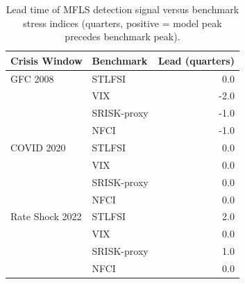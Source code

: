 \begin{table}[h]
\centering
\caption{Lead time of MFLS detection signal versus benchmark stress indices (quarters, positive = model peak precedes benchmark peak).}
\label{tab:lead_times}
\begin{tabular}{llr}
\toprule
Crisis Window & Benchmark & Lead (quarters) \\
\midrule
GFC 2008 & STLFSI & 0.0 \\
 & VIX & -2.0 \\
 & SRISK-proxy & -1.0 \\
 & NFCI & -1.0 \\
COVID 2020 & STLFSI & 0.0 \\
 & VIX & 0.0 \\
 & SRISK-proxy & 0.0 \\
 & NFCI & 0.0 \\
Rate Shock 2022 & STLFSI & 2.0 \\
 & VIX & 0.0 \\
 & SRISK-proxy & 1.0 \\
 & NFCI & 0.0 \\
\bottomrule
\end{tabular}
\end{table}